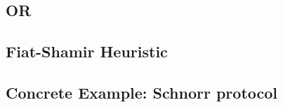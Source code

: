 \subsection{OR}
\label{subsec:sigma_OR}

\subsection{Fiat-Shamir Heuristic}
\label{subsec:fiat-shamir}


\subsection{Concrete Example: Schnorr protocol}
\label{subsec:schnorr}




